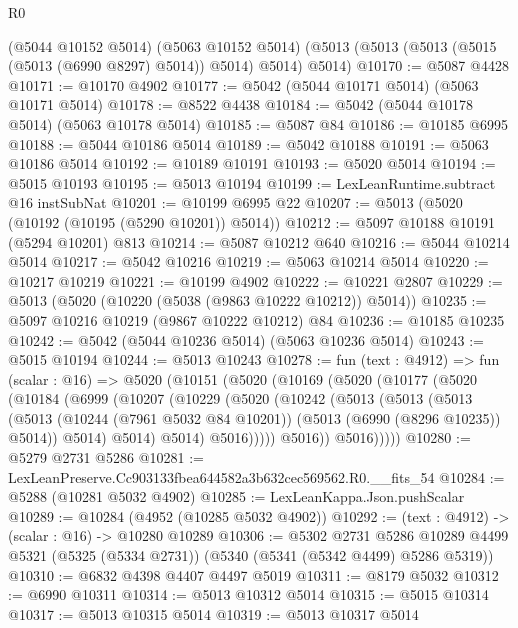 \begin{lexlean}{R0}
\begin{coremodule}
    (@5044 @10152 @5014)
    (@5063 @10152 @5014)
    (@5013 (@5013 (@5013 (@5015 (@5013 (@6990 @8297) @5014)) @5014) @5014) @5014)
@10170 := @5087 @4428
@10171 := @10170 @4902
@10177 := @5042 (@5044 @10171 @5014) (@5063 @10171 @5014)
@10178 := @8522 @4438
@10184 := @5042 (@5044 @10178 @5014) (@5063 @10178 @5014)
@10185 := @5087 @84
@10186 := @10185 @6995
@10188 := @5044 @10186 @5014
@10189 := @5042 @10188
@10191 := @5063 @10186 @5014
@10192 := @10189 @10191
@10193 := @5020 @5014
@10194 := @5015 @10193
@10195 := @5013 @10194
@10199 := LexLeanRuntime.subtract @16 instSubNat
@10201 := @10199 @6995 @22
@10207 := @5013 (@5020 (@10192 (@10195 (@5290 @10201)) @5014))
@10212 := @5097 @10188 @10191 (@5294 @10201) @813
@10214 := @5087 @10212 @640
@10216 := @5044 @10214 @5014
@10217 := @5042 @10216
@10219 := @5063 @10214 @5014
@10220 := @10217 @10219
@10221 := @10199 @4902
@10222 := @10221 @2807
@10229 := @5013 (@5020 (@10220 (@5038 (@9863 @10222 @10212)) @5014))
@10235 := @5097 @10216 @10219 (@9867 @10222 @10212) @84
@10236 := @10185 @10235
@10242 := @5042 (@5044 @10236 @5014) (@5063 @10236 @5014)
@10243 := @5015 @10194
@10244 := @5013 @10243
@10278 := fun (text : @4912) =>
  fun (scalar : @16) =>
  @5020
    (@10151
      (@5020
        (@10169
          (@5020
            (@10177
              (@5020
                (@10184
                  (@6999
                    (@10207
                      (@10229
                        (@5020
                          (@10242
                            (@5013
                              (@5013
                                (@5013
                                  (@5013
                                    (@10244 (@7961 @5032 @84 @10201))
                                    (@5013 (@6990 (@8296 @10235)) @5014))
                                  @5014)
                                @5014)
                              @5014)
                            @5016)))))
                  @5016))
              @5016)))))
@10280 := @5279 @2731 @5286
@10281 := LexLeanPreserve.Cc903133fbea644582a3b632cec569562.R0.__fits_54
@10284 := @5288 (@10281 @5032 @4902)
@10285 := LexLeanKappa.Json.pushScalar
@10289 := @10284 (@4952 (@10285 @5032 @4902))
@10292 := (text : @4912) -> (scalar : @16) -> @10280 @10289
@10306 := @5302
    @2731
    @5286
    @10289
    @4499
    @5321
    (@5325 (@5334 @2731))
    (@5340 (@5341 (@5342 @4499) @5286 @5319))
@10310 := @6832 @4398 @4407 @4497 @5019
@10311 := @8179 @5032
@10312 := @6990 @10311
@10314 := @5013 @10312 @5014
@10315 := @5015 @10314
@10317 := @5013 @10315 @5014
@10319 := @5013 @10317 @5014

\end{coremodule}
\end{lexlean}
